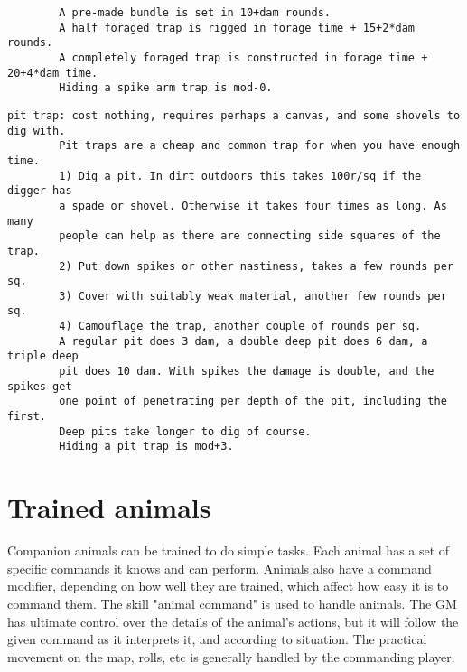 \begin{samepage}
\begin{verbatim}
        A pre-made bundle is set in 10+dam rounds.
        A half foraged trap is rigged in forage time + 15+2*dam rounds.
        A completely foraged trap is constructed in forage time + 20+4*dam time.
        Hiding a spike arm trap is mod-0.
\end{verbatim} \blocklistgap \begin{verbatim}
pit trap: cost nothing, requires perhaps a canvas, and some shovels to dig with.
        Pit traps are a cheap and common trap for when you have enough time.
        1) Dig a pit. In dirt outdoors this takes 100r/sq if the digger has
        a spade or shovel. Otherwise it takes four times as long. As many
        people can help as there are connecting side squares of the trap.
        2) Put down spikes or other nastiness, takes a few rounds per sq.
        3) Cover with suitably weak material, another few rounds per sq.
        4) Camouflage the trap, another couple of rounds per sq.
        A regular pit does 3 dam, a double deep pit does 6 dam, a triple deep
        pit does 10 dam. With spikes the damage is double, and the spikes get
        one point of penetrating per depth of the pit, including the first.
        Deep pits take longer to dig of course.
        Hiding a pit trap is mod+3.
\end{verbatim} \end{samepage} \normalsize











\section*{Trained animals}

Companion animals can be trained to do simple tasks. Each animal has a set of specific commands it knows and can perform. Animals also have a command modifier, depending on how well they are trained, which affect how easy it is to command them. The skill "animal command" is used to handle animals.
The GM has ultimate control over the details of the animal's actions, but it will follow the given command as it interprets it, and according to situation. The practical movement on the map, rolls, etc is generally handled by the commanding player.

